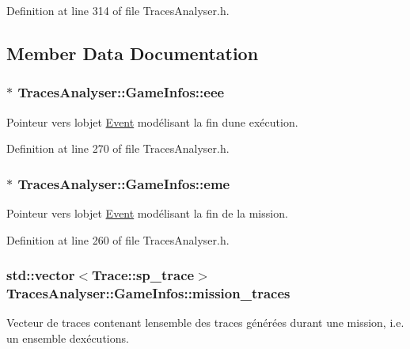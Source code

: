 Definition at line 314 of file Traces\+Analyser.\+h.



\subsection{Member Data Documentation}
\subsubsection[{\texorpdfstring{eee}{eee}}]{$\ast$ Traces\+Analyser\+::\+Game\+Infos\+::eee}\hypertarget{struct_traces_analyser_1_1_game_infos_ad8bab50191b3a7d55dbeb60b88e12de7}{}\label{struct_traces_analyser_1_1_game_infos_ad8bab50191b3a7d55dbeb60b88e12de7}
Pointeur vers l\textquotesingle{}objet \hyperlink{class_event}{Event} modélisant la fin d\textquotesingle{}une exécution. 

Definition at line 270 of file Traces\+Analyser.\+h.

\subsubsection[{\texorpdfstring{eme}{eme}}]{$\ast$ Traces\+Analyser\+::\+Game\+Infos\+::eme}\hypertarget{struct_traces_analyser_1_1_game_infos_a626886085d8342aaa0bb35d4ef768a2d}{}\label{struct_traces_analyser_1_1_game_infos_a626886085d8342aaa0bb35d4ef768a2d}
Pointeur vers l\textquotesingle{}objet \hyperlink{class_event}{Event} modélisant la fin de la mission. 

Definition at line 260 of file Traces\+Analyser.\+h.

\subsubsection[{\texorpdfstring{mission\+\_\+traces}{mission_traces}}]{\setlength{\rightskip}{0pt plus 5cm}std\+::vector$<${\bf Trace\+::sp\+\_\+trace}$>$ Traces\+Analyser\+::\+Game\+Infos\+::mission\+\_\+traces}\hypertarget{struct_traces_analyser_1_1_game_infos_a97beef39c7cb8d643ba4f11de8b7073b}{}\label{struct_traces_analyser_1_1_game_infos_a97beef39c7cb8d643ba4f11de8b7073b}
Vecteur de traces contenant l\textquotesingle{}ensemble des traces générées durant une mission, i.\+e. un ensemble d\textquotesingle{}exécutions. 

